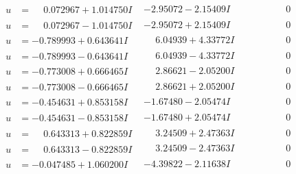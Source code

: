 \documentclass[1p]{elsarticle_modified}
\theoremstyle{definition}
\begin{document}
$$\begin{array}{c|c|c}
\begin{aligned}
u &= \phantom{-}0.072967 + 1.014750 I\end{aligned}
 & -2.95072 - 2.15409 I & \phantom{-0.000000 } 0 \\ \hline\begin{aligned}
u &= \phantom{-}0.072967 - 1.014750 I\end{aligned}
 & -2.95072 + 2.15409 I & \phantom{-0.000000 } 0 \\ \hline\begin{aligned}
u &= -0.789993 + 0.643641 I\end{aligned}
 & \phantom{-}6.04939 + 4.33772 I & \phantom{-0.000000 } 0 \\ \hline\begin{aligned}
u &= -0.789993 - 0.643641 I\end{aligned}
 & \phantom{-}6.04939 - 4.33772 I & \phantom{-0.000000 } 0 \\ \hline\begin{aligned}
u &= -0.773008 + 0.666465 I\end{aligned}
 & \phantom{-}2.86621 - 2.05200 I & \phantom{-0.000000 } 0 \\ \hline\begin{aligned}
u &= -0.773008 - 0.666465 I\end{aligned}
 & \phantom{-}2.86621 + 2.05200 I & \phantom{-0.000000 } 0 \\ \hline\begin{aligned}
u &= -0.454631 + 0.853158 I\end{aligned}
 & -1.67480 - 2.05474 I & \phantom{-0.000000 } 0 \\ \hline\begin{aligned}
u &= -0.454631 - 0.853158 I\end{aligned}
 & -1.67480 + 2.05474 I & \phantom{-0.000000 } 0 \\ \hline\begin{aligned}
u &= \phantom{-}0.643313 + 0.822859 I\end{aligned}
 & \phantom{-}3.24509 + 2.47363 I & \phantom{-0.000000 } 0 \\ \hline\begin{aligned}
u &= \phantom{-}0.643313 - 0.822859 I\end{aligned}
 & \phantom{-}3.24509 - 2.47363 I & \phantom{-0.000000 } 0 \\ \hline\begin{aligned}
u &= -0.047485 + 1.060200 I\end{aligned}
 & -4.39822 - 2.11638 I & \phantom{-0.000000 } 0 \\ \hline\begin{aligned}

\end{aligned}
\end{array}$$
\end{document}

